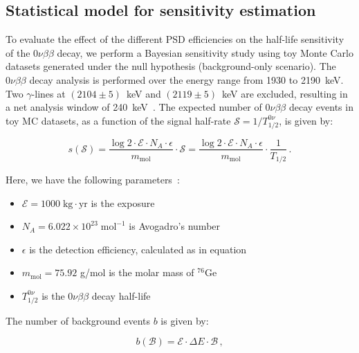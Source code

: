 \subsection{Statistical model for sensitivity estimation}
\label{sec:05_stat_model}


To evaluate the effect of the different PSD efficiencies on the half-life sensitivity of the $0 \nu \beta \beta$ decay, we perform a Bayesian sensitivity study using toy Monte Carlo datasets generated under the null hypothesis (background-only scenario). The $0 \nu \beta \beta$ decay analysis is performed over the energy range from 1930 to 2190~keV. 
Two $\gamma$-lines at $(2104 \pm 5)$~keV and $(2119 \pm 5)$~keV are excluded, resulting in a net analysis window of 240~keV~\cite{gerda_collaboration_final_2020}. The expected number of $0 \nu \beta \beta$ decay events in toy MC datasets, as a function of the signal half-rate $\mathcal{S} = 1/T^{0 \nu}_{1/2}$, is given by:


\begin{equation}
\label{eq:0vbb_signal_counts}
	s \left( \mathcal{S} \right) =  \frac{\log{2} \cdot \mathcal{E} \cdot N_A \cdot \epsilon}{m_{\mathrm{mol}}} \cdot \mathcal{S} = \frac{\log{2} \cdot \mathcal{E} \cdot N_A \cdot \epsilon}{m_{\mathrm{mol}}} \cdot \frac{1}{T_{1/2}} \,.
\end{equation}

Here, we have the following parameters~\cite{agostini_background-free_2017}:

\begin{itemize}
    \item $\mathcal{E} = 1000 \;\mathrm{kg} \cdot {\mathrm{yr}}$ is the exposure
    \item $N_A = 6.022 \times 10^{23} \; \mathrm{mol}^{-1}$ is Avogadro's number
    \item $\epsilon$ is the detection efficiency, calculated as in equation~
    \item $m_{\mathrm{mol}} = 75.92$ g/mol is the molar mass of $^{76}$Ge 
    \item $T^{0 \nu}_{1/2}$ is the $0 \nu \beta \beta$ decay half-life
\end{itemize}

\noindent The number of background events $b$ is given by:


\begin{equation}
\label{eq:0vbb_background_counts}
	b \left( \mathcal{B} \right) = \mathcal{E} \cdot \Delta E \cdot \mathcal{B} \,,
\end{equation}

